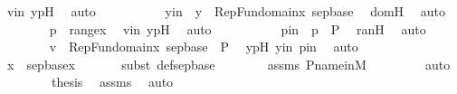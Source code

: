 \begin{isabellebody}
\ vin\ ypH\ \isamarkupfalse%
\ auto\ \isanewline
\ \ \ \ \ \ \isamarkupfalse%
\ \isamarkupfalse%
\ yin\ {\isacharcolon}{\kern0pt}\ {\isachardoublequoteopen}y\ {\isasymin}\ {\isasymUnion}RepFun{\isacharparenleft}{\kern0pt}domain{\isacharparenleft}{\kern0pt}x{\isacharparenright}{\kern0pt}{\isacharcomma}{\kern0pt}\ sep{\isacharunderscore}{\kern0pt}base{\isacharparenright}{\kern0pt}{\isachardoublequoteclose}\ \isamarkupfalse%
\ domH\ \isamarkupfalse%
\ auto\isanewline
\ \ \ \ \ \ \isamarkupfalse%
\ {\isachardoublequoteopen}p\ {\isasymin}\ range{\isacharparenleft}{\kern0pt}x{\isacharparenright}{\kern0pt}{\isachardoublequoteclose}\ \isamarkupfalse%
\ vin\ ypH\ \isamarkupfalse%
\ auto\ \isanewline
\ \ \ \ \ \ \isamarkupfalse%
\ \isamarkupfalse%
\ pin\ {\isacharcolon}{\kern0pt}\ {\isachardoublequoteopen}p\ {\isasymin}\ P{\isachardoublequoteclose}\ \isamarkupfalse%
\ ranH\ \isamarkupfalse%
\ auto\isanewline
\ \ \ \ \ \ \isamarkupfalse%
\ {\isachardoublequoteopen}v\ {\isasymin}\ {\isasymUnion}RepFun{\isacharparenleft}{\kern0pt}domain{\isacharparenleft}{\kern0pt}x{\isacharparenright}{\kern0pt}{\isacharcomma}{\kern0pt}\ sep{\isacharunderscore}{\kern0pt}base{\isacharparenright}{\kern0pt}\ {\isasymtimes}\ P{\isachardoublequoteclose}\ \isamarkupfalse%
\ ypH\ yin\ pin\ \isamarkupfalse%
\ auto\isanewline
\ \ \ \ \isamarkupfalse%
\isanewline
\ \ \ \ \isamarkupfalse%
\ \isamarkupfalse%
\ {\isachardoublequoteopen}x\ {\isasymin}\ sep{\isacharunderscore}{\kern0pt}base{\isacharparenleft}{\kern0pt}x{\isacharparenright}{\kern0pt}{\isachardoublequoteclose}\isanewline
\ \ \ \ \ \ \isamarkupfalse%
{\isacharparenleft}{\kern0pt}subst\ def{\isacharunderscore}{\kern0pt}sep{\isacharunderscore}{\kern0pt}base{\isacharparenright}{\kern0pt}\isanewline
\ \ \ \ \ \ \isamarkupfalse%
\ assms\ P{\isacharunderscore}{\kern0pt}name{\isacharunderscore}{\kern0pt}in{\isacharunderscore}{\kern0pt}M\ \isanewline
\ \ \ \ \ \ \isamarkupfalse%
\ auto\isanewline
\ \ \isamarkupfalse%
\isanewline
\isanewline
\ \ \isamarkupfalse%
\ \isamarkupfalse%
\ {\isacharquery}{\kern0pt}thesis\ \isamarkupfalse%
\ assms\ \isamarkupfalse%
\ auto\isanewline
{}\isamarkupfalse%
%
\endisatagproof

\end{isabellebody}
